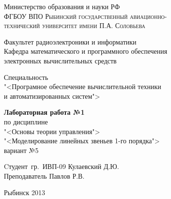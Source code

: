 	\begin{titlepage}
	\newpage
		\begin{center}
			Министерство образования и науки РФ\\
			\textsc{ФГБОУ ВПО Рыбинский государственный авиационно-\\
			технический университет имени П.А. Соловьева}
		\end{center}
		\vspace{1em}
		\begin{center}
			Факультет радиоэлектроники и информатики\\
			Кафедра математического и программного обеспечения\\
			электронных вычислительных средств\\
		\end{center}
		\begin{center}
			Специальность\\
			"<Програмное обеспечение вычислительной техники\\
			и автоматизированных систем">
		\end{center}
		\vspace{4cm}
		\begin{center}
			{\bfseries Лабораторная работа №1}\\
			по дисциплине\\
			"<Основы теории управления">\\
			"<Моделирование линейных звеньев 1-го порядка">\\
			вариант №5
		\end{center}
		\begin{flushleft}
			Cтудент~гр.~ИВП-09 \hrulefill Кулаевский Д.Ю.\\
			Преподаватель \hrulefill Павлов Р.В.
		\end{flushleft}
		\vspace{\fill}
		\begin{center}
			Рыбинск 2013
		\end{center}
	\end{titlepage}